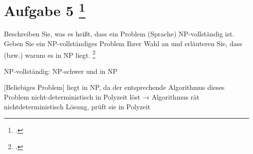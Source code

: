 \documentclass{lehramt-informatik-aufgabe}
\begin{document}
\section{Aufgabe 5
\footcite{46115:2016:03}}

Beschreiben Sie, was es heißt, dass ein Problem (Sprache) NP-vollständig
ist. Geben Sie ein NP-vollständiges Problem Ihrer Wahl an und erläuteren
Sie, dass (bzw.) warum es in NP liegt.
\footcite[Aufgabe 11, Seite 15]{theo:ab:4}

\begin{liAntwort}
NP-vollständig: NP-schwer und in NP

[Beliebiges Problem] liegt in NP, da der entsprechende Algorithmus
dieses Problem nicht-deterministisch in Polyzeit löst → Algorithmus rät
nichtdeterministisch Lösung, prüft sie in Polyzeit
\end{liAntwort}
\end{document}
